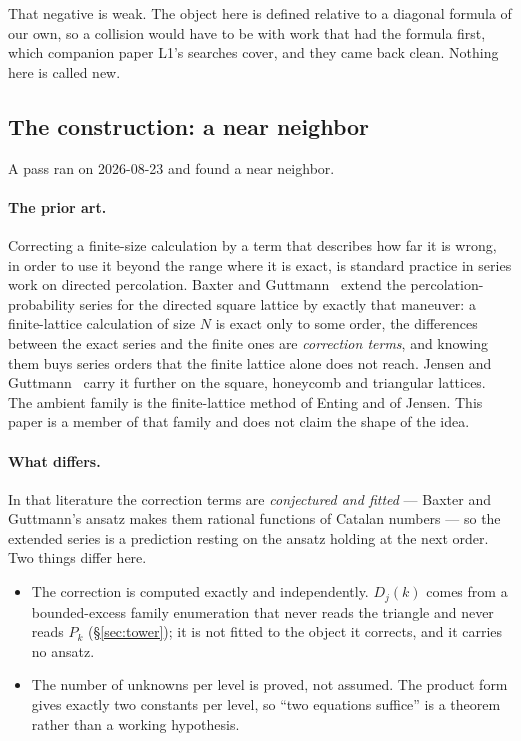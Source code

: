 \documentclass[11pt]{article}
\begin{document}
That negative is weak. The object here is defined relative to a diagonal
formula of our own, so a collision would have to be with work that had the
formula first, which companion paper L1's searches cover, and they came back
clean. Nothing here is called new.

\subsection{The construction: a near neighbor}

A pass ran on 2026-08-23 and found a near neighbor.

\paragraph{The prior art.} Correcting a finite-size calculation by a term that
describes how far it is wrong, in order to use it beyond the range where it is
exact, is standard practice in series work on directed percolation. Baxter and
Guttmann~\cite{baxter1988} extend the percolation-probability series for the
directed square lattice by exactly that maneuver: a finite-lattice calculation
of size $N$ is exact only to some order, the differences between the exact
series and the finite ones are \emph{correction terms}, and knowing them buys
series orders that the finite lattice alone does not reach. Jensen and
Guttmann~\cite{jensen1995} carry it further on the square, honeycomb and
triangular lattices. The ambient family is the finite-lattice method of Enting
and of Jensen. This paper is a member of that family and does not claim the
shape of the idea.

\paragraph{What differs.} In that
literature the correction terms are \emph{conjectured and fitted} --- Baxter and
Guttmann's ansatz makes them rational functions of Catalan numbers --- so the
extended series is a prediction resting on the ansatz holding at the next
order. Two things differ here.

\begin{itemize}
\item The correction is computed exactly and independently. $D_j(k)$
comes from a bounded-excess family enumeration that never reads the triangle
and never reads $P_k$ (\S\ref{sec:tower}); it is not fitted to the object it
corrects, and it carries no ansatz.
\item The number of unknowns per level is proved, not assumed. The product form
gives exactly two constants per level, so ``two equations suffice'' is a
theorem rather than a working hypothesis.
\end{itemize}
\end{document}
